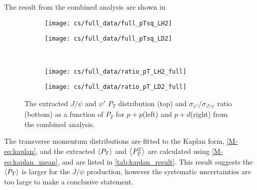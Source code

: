 \documentclass[../main.tex]{subfiles}
\begin{document}
The result from the combined analysis are shown in
\begin{figure}[h!]
	\centering
	\begin{subfigure}{0.45\linewidth}
		\texttt{[image: cs/full\_data/full\_pTsq\_LH2]}
	\end{subfigure}
	\begin{subfigure}{0.45\linewidth}
		\texttt{[image: cs/full\_data/full\_pTsq\_LD2]}
	\end{subfigure}
	\\
	\begin{subfigure}{0.45\linewidth}
		\texttt{[image: cs/full\_data/ratio\_pT\_LH2\_full]}
	\end{subfigure}
	\begin{subfigure}{0.45\linewidth}
		\texttt{[image: cs/full\_data/ratio\_pT\_LD2\_full]}
	\end{subfigure}
	\caption{The extracted $J/\psi$ and $\psi'$ $P_T$ distribution (top) and $\sigma_{\psi'}/\sigma_{J/\psi}$
		ratio (bottom) as a function of $P_T$ for $p+p$(left) and $p+d$(right) from
		the combined analysis.}
	\label{fig:pT_combined}
\end{figure}
\begin{table}[h!]
	\centering
	\caption{Cross section $d\sigma/dp^2_T$ (in \unit{\nano\barn\GeV^{-2} nucleon^{-1}}) and the
		$\sigma_{\psi'}/\sigma_{J/\psi}$ ratio for $p+p$ extracted from the combined analysis, with
		their statistical and systematic uncertainties and the $\expval{p_T}$ (in \unit{\GeV})in each bin.}
	
\end{table}
\begin{table}[h!]
	\centering
	\caption{Cross section $d\sigma/dp^2_T$ (in \unit{\nano\barn\GeV^{-2} nucleon^{-1}}) and the
		$\sigma_{\psi'}/\sigma_{J/\psi}$ ratio for $p+d$ extracted from the combined analysis, with
		their statistical and systematic uncertainties and the $\expval{p_T}$ (in \unit{\GeV})in each bin.}
	
\end{table}

The transverse momentum distributions are fitted to the Kaplan form, \cref{M-eq:kaplan}, and the extracted
$\expval{P_T}$ and $\expval{P^2_T}$ are calculated using \cref{M-eq:kaplan_mean},
and are listed in \cref{tab:kaplan_result}. This result suggests the
$\expval{P_T}$ is larger for the $J/\psi$ production, however the systematic uncertainties are too
large to make a conclusive statement.
\end{document}
